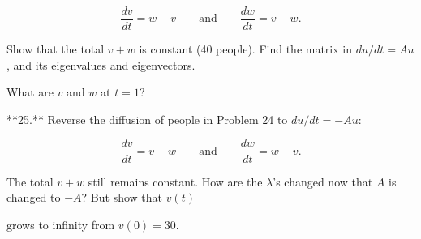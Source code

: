 \[\frac{dv}{dt}=w-v\qquad\text{and}\qquad\frac{dw}{dt}=v-w.\]

Show that the total \(v+w\) is constant (40 people). Find the matrix in \(du/dt=Au\), and its eigenvalues and eigenvectors.

What are \(v\) and \(w\) at \(t=1\)?

**25.** Reverse the diffusion of people in Problem 24 to \(du/dt=-Au\):

\[\frac{dv}{dt}=v-w\qquad\text{and}\qquad\frac{dw}{dt}=w-v.\]

The total \(v+w\) still remains constant. How are the \(\lambda\)'s changed now that \(A\) is changed to \(-A\)? But show that \(v(t)\)

grows to infinity from \(v(0)=30\).

